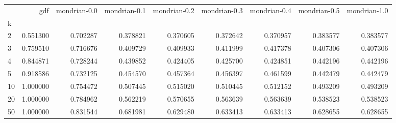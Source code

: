 \begin{tabular}{lrrrrrrrr}
\toprule
{} &       gdf &  mondrian-0.0 &  mondrian-0.1 &  mondrian-0.2 &  mondrian-0.3 &  mondrian-0.4 &  mondrian-0.5 &  mondrian-1.0 \\
k  &           &               &               &               &               &               &               &               \\
\midrule
2  &  0.551300 &      0.702287 &      0.378821 &      0.370605 &      0.372642 &      0.370957 &      0.383577 &      0.383577 \\
3  &  0.759510 &      0.716676 &      0.409729 &      0.409933 &      0.411999 &      0.417378 &      0.407306 &      0.407306 \\
4  &  0.844871 &      0.728244 &      0.439852 &      0.424405 &      0.425700 &      0.424851 &      0.442196 &      0.442196 \\
5  &  0.918586 &      0.732125 &      0.454570 &      0.457364 &      0.456397 &      0.461599 &      0.442479 &      0.442479 \\
10 &  1.000000 &      0.754472 &      0.507445 &      0.515020 &      0.510445 &      0.512152 &      0.493209 &      0.493209 \\
20 &  1.000000 &      0.784962 &      0.562219 &      0.570655 &      0.563639 &      0.563639 &      0.538523 &      0.538523 \\
50 &  1.000000 &      0.831544 &      0.681981 &      0.629480 &      0.633413 &      0.633413 &      0.628655 &      0.628655 \\
\bottomrule
\end{tabular}
